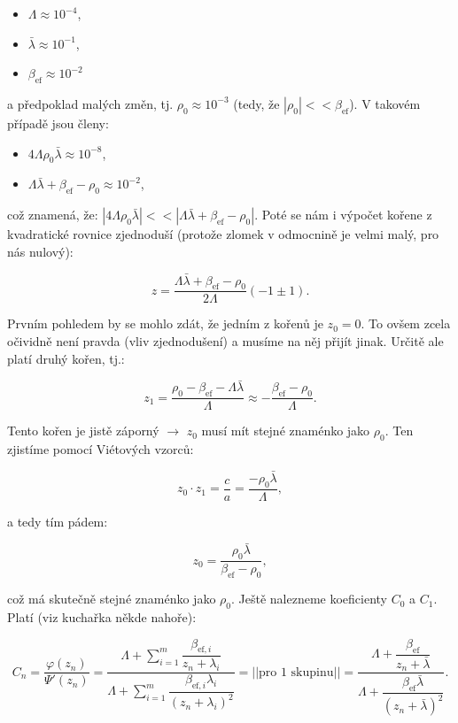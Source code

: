 \begin{itemize}
  \item $\Lambda \approx 10^{-4}$,
  \item $\bar{\lambda} \approx 10^{-1}$,
  \item $\beta_{\text{ef}} \approx 10^{-2}$
\end{itemize}

a předpoklad malých změn, tj. $\rho_0 \approx 10^{-3}$ (tedy, že $|\rho_0| << \beta_{\text{ef}}$). V takovém případě jsou členy:

\begin{itemize}
  \item $4 \Lambda \rho_0 \bar{\lambda} \approx 10^{-8}$,
  \item $\Lambda \bar{\lambda} + \beta_{\text{ef}} - \rho_0 \approx 10^{-2}$,
\end{itemize}

což znamená, že: $|4 \Lambda \rho_0 \bar{\lambda}| << |\Lambda \bar{\lambda} + \beta_{\text{ef}} - \rho_0|$. Poté se nám i výpočet kořene z kvadratické rovnice zjednoduší (protože zlomek v odmocnině je velmi malý, pro nás nulový):

$$ z = \dfrac{\Lambda \bar{\lambda} + \beta_{\text{ef}} - \rho_0}{2 \Lambda} \left ( -1 \pm 1 \right ). $$

Prvním pohledem by se mohlo zdát, že jedním z kořenů je $z_0 = 0$. To ovšem zcela očividně není pravda (vliv zjednodušení) a musíme na něj přijít jinak. Určitě ale platí druhý kořen, tj.:

$$ z_1 = \dfrac{\rho_0 - \beta_{\text{ef}} - \Lambda \bar{\lambda}}{\Lambda} \approx -\dfrac{\beta_{\text{ef}} - \rho_0}{\Lambda}. $$

 Tento kořen je jistě záporný $\rightarrow$ $z_0$ musí mít stejné znaménko jako $\rho_0$. Ten zjistíme pomocí Viétových vzorců:

$$ z_0 \cdot z_1 = \dfrac{c}{a} = \dfrac{-\rho_0 \bar{\lambda}}{\Lambda}, $$

a tedy tím pádem:

$$ z_0 = \dfrac{\rho_0 \bar{\lambda}}{\beta_{\text{ef}} - \rho_0}, $$

což má skutečně stejné znaménko jako $\rho_0$. Ještě nalezneme koeficienty $C_0$ a $C_1$. Platí (viz kuchařka někde nahoře):

$$ C_n = \dfrac{\varphi(z_n)}{\Psi'(z_n)} = \dfrac{\Lambda + \sum_{i = 1}^m \dfrac{\beta_{\text{ef},i}}{z_n + \lambda_i}}{\Lambda  + \sum_{i = 1}^m \dfrac{\beta_{\text{ef},i} \lambda_i}{(z_n + \lambda_i)^2}} = ||\text{pro 1 skupinu}|| =  \dfrac{\Lambda + \dfrac{\beta_{\text{ef}}}{z_n + \bar{\lambda}}}{\Lambda  + \dfrac{\beta_{\text{ef}} \bar{\lambda}}{(z_n + \bar{\lambda})^2}}. $$

